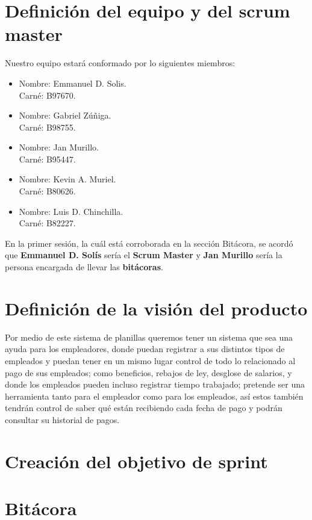\documentclass{article}
\begin{document}
\newpage
\tableofcontents

\newpage


\newpage
\section{Definición del equipo y del scrum master}
Nuestro equipo estará conformado por lo siguientes miembros:
\begin{itemize}
  \item Nombre: Emmanuel D. Solis.\\Carné: B97670.
  \item Nombre: Gabriel Zúñiga.\\Carné: B98755.
  \item Nombre: Jan Murillo.\\Carné: B95447.
  \item Nombre: Kevin A. Muriel.\\Carné: B80626.
  \item Nombre: Luis D. Chinchilla.\\Carné: B82227.
\end{itemize}
En la primer sesión, la cuál está corroborada en la sección
Bitácora, se acordó que \textbf{Emmanuel D. Solís} sería el \textbf{Scrum Master}
y \textbf{Jan Murillo} sería la persona encargada de llevar las \textbf{bitácoras}.

\section{Definición de la visión del producto}
Por medio de este sistema de planillas queremos tener un sistema que sea
una ayuda para los empleadores, donde puedan registrar a sus distintos tipos
de empleados y puedan tener en un mismo lugar control de todo lo relacionado
al pago de sus empleados; como beneficios, rebajos de ley, desglose de salarios,
y donde los empleados pueden incluso registrar tiempo trabajado; pretende
ser una herramienta tanto para el empleador como para los empleados, así
estos también tendrán control de saber qué están recibiendo cada fecha de pago
y podrán consultar su historial de pagos.

\section{Creación del objetivo de sprint}

\section{Bitácora}
\end{document}
